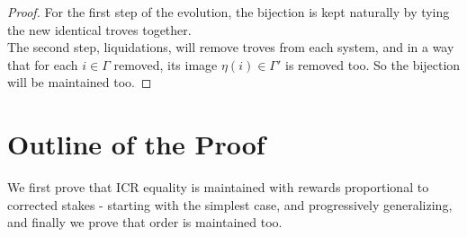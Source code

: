 \documentclass[reqno]{article}
\begin{document}
\begin{proof}
  For the first step of the evolution, the bijection is kept naturally by tying the new identical troves together.\\
  The second step, liquidations, will remove troves from each system, and in a way that for each $i \in \Gamma$ removed, its image $\eta(i) \in \Gamma'$ is removed too. So the bijection will be maintained too.
\end{proof}

\section{Outline of the Proof}

We first prove that ICR equality is maintained with rewards proportional to corrected stakes - starting with the simplest case, and progressively generalizing, and finally we prove that order is maintained too.
\end{document}

